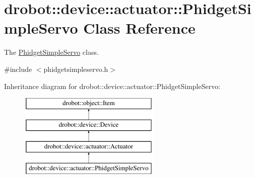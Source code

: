 \hypertarget{classdrobot_1_1device_1_1actuator_1_1PhidgetSimpleServo}{\section{drobot\-:\-:device\-:\-:actuator\-:\-:Phidget\-Simple\-Servo Class Reference}
\label{classdrobot_1_1device_1_1actuator_1_1PhidgetSimpleServo}
}


The \hyperlink{classdrobot_1_1device_1_1actuator_1_1PhidgetSimpleServo}{Phidget\-Simple\-Servo} class.  




{\ttfamily \#include $<$phidgetsimpleservo.\-h$>$}

Inheritance diagram for drobot\-:\-:device\-:\-:actuator\-:\-:Phidget\-Simple\-Servo\-:\begin{figure}[H]
\begin{center}
\leavevmode
\includegraphics[height=4.000000cm]{classdrobot_1_1device_1_1actuator_1_1PhidgetSimpleServo}
\end{center}
\end{figure}
